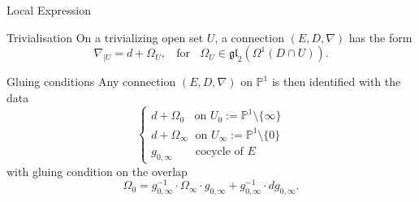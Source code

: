 \documentclass[10pt,xcolor=svgnames]{beamer} %
\newcommand{\Z}{\mathbb{Z}}
\newcommand{\C}{\mathbb{C}}
\renewcommand{\P}{\mathbb{P}}
\newcommand{\g}{\mathfrak{g}}
\renewcommand{\O}{\mathscr{O}}
\newcommand{\1}{\mathbbm{1}}
\begin{document}




\begin{frame}{Local Expression}
	\begin{exampleblock}{Trivialisation}
		On a trivializing open set $U$, a connection $(E,D,\nabla)$ has the form
		\[\nabla_{|U}=d+\Omega_U, \;\;\text{ for }\;\;\Omega_U\in \mathfrak{gl}_2(\Omega^1(D\cap U)).\]
	\end{exampleblock}
	\begin{exampleblock}{Gluing conditions}
		Any connection $(E, D, \nabla)$ on $\P^1$ is then identified with the data
		\[\begin{cases*}d+\Omega_0 \;\;\text{ on }U_0:=\P^1\setminus\{\infty\}\\d+\Omega_\infty \;\text{ on }U_\infty:=\P^1\setminus\{0\}\\g_{0,\infty}\;\;\;\;\;\;\text{ cocycle of } E\end{cases*}\]
		with gluing condition on the overlap
		\[\Omega_0=g_{0,\infty}^{-1}\cdot \Omega_\infty\cdot g_{0,\infty}+ g_{0,\infty}^{-1}\cdot dg_{0,\infty}.\]
	\end{exampleblock}
\end{frame}





\end{document}
